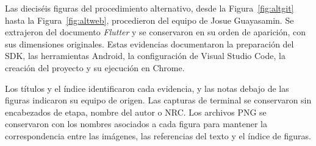 \documentclass[12pt,letterpaper]{article}
\begin{document}
Las dieciséis figuras del procedimiento alternativo, desde la Figura~\ref{fig:altgit} hasta la Figura~\ref{fig:altweb}, procedieron del equipo de Josue Guayasamin. Se extrajeron del documento \textit{Flutter} y se conservaron en su orden de aparición, con sus dimensiones originales. Estas evidencias documentaron la preparación del SDK, las herramientas Android, la configuración de Visual Studio Code, la creación del proyecto y su ejecución en Chrome.

Los títulos y el índice identificaron cada evidencia, y las notas debajo de las figuras indicaron su equipo de origen. Las capturas de terminal se conservaron sin encabezados de etapa, nombre del autor o NRC. Los archivos PNG se conservaron con los nombres asociados a cada figura para mantener la correspondencia entre las imágenes, las referencias del texto y el índice de figuras.
\end{document}
